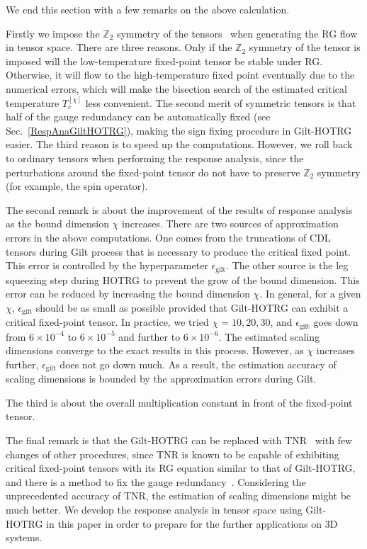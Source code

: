 \documentclass[aps,prb,reprint,superscriptaddress]{revtex4-2}
\begin{document}
We end this section with a few remarks on the above calculation. 
%

Firstly we impose the $\mathbb{Z}_2$ symmetry of the
tensors~\cite{Singh2010SymTen, Singh2011U1Ten} when generating the RG
flow in tensor space. There are three reasons. Only if the
$\mathbb{Z}_2$ symmetry of the tensor is imposed will the
low-temperature fixed-point tensor be stable under RG.  Otherwise, it
will flow to the high-temperature fixed point eventually due to the
numerical errors, which will make the bisection search of the estimated
critical temperature $T_c^{[\chi]}$ less convenient. The second merit of
symmetric tensors is that half of the gauge redundancy can be
automatically fixed (see Sec.~\ref{RespAnaGiltHOTRG}), making the sign
fixing procedure in Gilt-HOTRG easier. The third reason is to speed up
the computations. However, we roll back to ordinary tensors when
performing the response analysis, since the perturbations around the
fixed-point tensor do not have to preserve $\mathbb{Z}_2$ symmetry (for
example, the spin operator). 
%

The second remark is about the improvement of the results of response
analysis as the bound dimension $\chi$ increases. There are two sources
of approximation errors in the above computations. One comes from the
truncations of CDL tensors during Gilt process that is necessary to
produce the critical fixed point. This error is controlled by the
hyperparameter $\epsilon_{\text{gilt}}$. The other source is the leg
squeezing step during HOTRG to prevent the grow of the bound dimension.
This error can be reduced by increasing the bound dimension $\chi$. In
general, for a given $\chi$, $\epsilon_{\text{gilt}}$ should be as small
as possible provided that Gilt-HOTRG can exhibit a critical fixed-point
tensor. In practice, we tried $\chi = 10, 20, 30$, and
$\epsilon_{\text{gilt}}$ goes down from $6\times 10^{-4}$ to
$6\times10^{-5}$ and further to $6\times10^{-6}$.  The estimated scaling
dimensions converge to the exact results in this process. However, as
$\chi$ increases further, $\epsilon_{\text{gilt}}$ does not go down
much. As a result, the estimation accuracy of scaling dimensions is
bounded by the approximation errors during Gilt. 
%

The third is about the overall multiplication constant in front of the
fixed-point tensor.
%

The final remark is that the Gilt-HOTRG can be replaced with
TNR~\cite{tnr,tnralgo} with few changes of other procedures, since TNR
is known to be capable of exhibiting critical fixed-point tensors with
its RG equation similar to that of Gilt-HOTRG, and there is a method to
fix the gauge redundancy~\cite{tnralgo}. Considering the unprecedented
accuracy of TNR, the estimation of scaling dimensions might be much
better. We develop the response analysis in tensor space using
Gilt-HOTRG in this paper in order to prepare for the further
applications on 3D systems.
%
\end{document}
